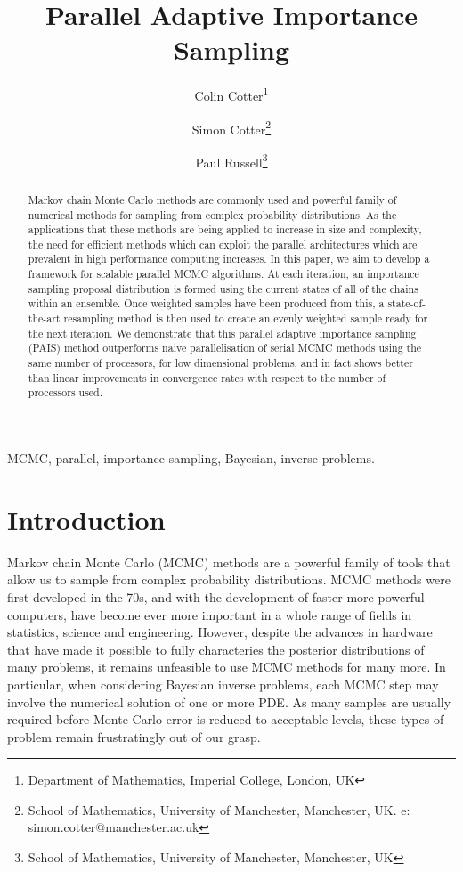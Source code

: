 \documentclass[final]{siamltex}
\author{Colin Cotter\thanks{Department of Mathematics, Imperial
    College, London, UK} \and Simon Cotter\thanks{School of
    Mathematics, University of Manchester, Manchester, UK. e: simon.cotter@manchester.ac.uk} \and Paul Russell\thanks{School of
    Mathematics, University of Manchester, Manchester, UK}}
\title{Parallel Adaptive Importance Sampling}
\begin{document}
\maketitle
\begin{abstract}
  Markov chain Monte Carlo methods are commonly used and powerful
  family of numerical methods for sampling from complex probability
  distributions. As the applications that these methods are being
  applied to increase in size and complexity, the need for efficient
  methods which can exploit the parallel architectures which are
  prevalent in high performance computing increases. In this paper, we
  aim to develop a framework for scalable parallel MCMC algorithms. At
  each iteration, an importance sampling proposal distribution is
  formed using the current states of all of the chains within an
  ensemble. Once weighted samples have been produced from this, a
  state-of-the-art resampling method is then used to create an evenly
  weighted sample ready for the next iteration. We demonstrate that
  this parallel adaptive importance sampling (PAIS) method outperforms
  naive parallelisation of serial MCMC methods using the same number
  of processors, for low dimensional problems, and in fact shows
  better than linear improvements in convergence rates with respect to
  the number of processors used.
\end{abstract}
\begin{keywords}MCMC, parallel, importance sampling, Bayesian, inverse problems.
\end{keywords}
\section{Introduction}
Markov chain Monte Carlo (MCMC) methods are a powerful family of tools
that allow us to sample from complex probability distributions. MCMC
methods were first developed in the 70s\cite{hastings1970monte}, and with the development of
faster more powerful computers, have become ever more important in a
whole range of fields in statistics, science and engineering. However,
despite the advances in hardware that have made it possible to fully
characteries the posterior distributions of many problems, it remains
unfeasible to use MCMC methods for many more. In particular, when
considering Bayesian inverse problems, each MCMC step may involve the
numerical solution of one or more PDE. As many samples are usually
required before Monte Carlo error is reduced to acceptable levels,
these types of problem remain frustratingly out of our grasp.
\end{document}
